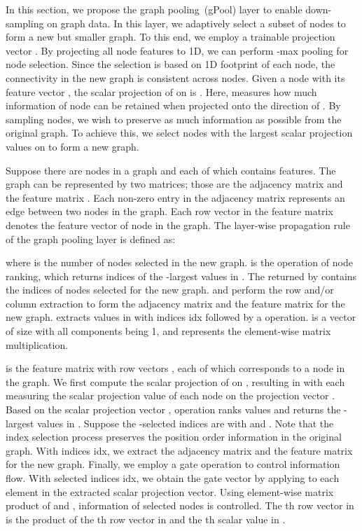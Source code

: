 \documentclass{article}
\begin{document}
In this section, we propose the graph pooling~(gPool) layer to
enable down-sampling on graph data. In this layer, we adaptively
select a subset of nodes to form a new but smaller graph. To this
end, we employ a trainable projection vector . By
projecting all node features to 1D, we can perform -max pooling
for node selection. Since the selection is based on 1D footprint of
each node, the connectivity in the new graph is consistent across
nodes. Given a node  with its feature vector , the
scalar projection of  on  is . Here, 
measures how much information of node  can be retained when
projected onto the direction of . By sampling nodes, we
wish to preserve as much information as possible from the original
graph. To achieve this, we select nodes with the largest scalar
projection values on  to form a new graph.

Suppose there are  nodes in a graph  and each of which
contains  features. The graph can be represented by two matrices;
those are the adjacency matrix  and the feature matrix . 
Each non-zero entry in the adjacency matrix  represents an edge between two nodes in the graph.
Each row
vector  in the feature matrix  denotes the feature
vector of node  in the graph. The layer-wise propagation rule of the
graph pooling layer  is defined as:

where  is the number of nodes selected in the new graph.
 is the operation of node ranking, which
returns indices of the -largest values in . The
 returned by  contains the
indices of nodes selected for the new graph.  and  perform the row and/or
column extraction to form the adjacency matrix and the feature
matrix for the new graph.  extracts values in
 with indices idx followed by a  operation.
 is a vector of size  with all
components being 1, and  represents the element-wise matrix
multiplication.

 is the feature matrix with row vectors , each of
which corresponds to a node in the graph. We first compute the
scalar projection of  on , resulting in
 with each  measuring
the scalar projection value of each node on the projection vector
. Based on the scalar projection vector ,  operation ranks values and returns the
-largest values in . Suppose the -selected indices
are  with  and . Note that the index selection process preserves the position
order information in the original graph. With indices idx, we
extract the adjacency matrix 
and the feature matrix 
for the new graph. Finally, we employ a gate operation to control
information flow. With selected indices idx, we obtain the gate
vector  by applying  to each
element in the extracted scalar projection vector. Using
element-wise matrix product of  and , information of selected nodes is controlled. The
th row vector in  is the product of the th row
vector in  and the th scalar value in .
\end{document}
